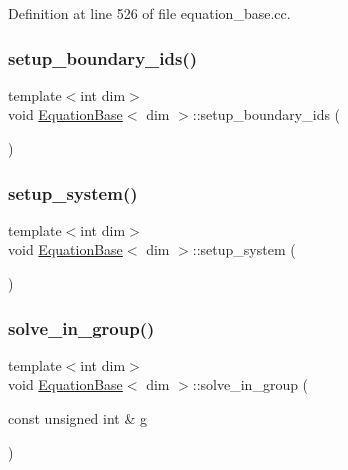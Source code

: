 Definition at line 526 of file equation\+\_\+base.\+cc.

\mbox{\label{class_equation_base_aeeac77cdccc1907fe6e53b27e614ee86}} 
\subsubsection{\texorpdfstring{setup\+\_\+boundary\+\_\+ids()}{setup\_boundary\_ids()}}
{\footnotesize\ttfamily template$<$int dim$>$ \\
void \hyperlink{class_equation_base}{Equation\+Base}$<$ dim $>$\+::setup\+\_\+boundary\+\_\+ids (\begin{DoxyParamCaption}{ }\end{DoxyParamCaption})\hspace{0.3cm}{\ttfamily [private]}}

\mbox{\label{class_equation_base_af47f226b1564534307552d7d4e72a54d}} 
\subsubsection{\texorpdfstring{setup\+\_\+system()}{setup\_system()}}
{\footnotesize\ttfamily template$<$int dim$>$ \\
void \hyperlink{class_equation_base}{Equation\+Base}$<$ dim $>$\+::setup\+\_\+system (\begin{DoxyParamCaption}{ }\end{DoxyParamCaption})\hspace{0.3cm}{\ttfamily [private]}}

\mbox{\label{class_equation_base_a591282eb0ced01a7f22e29e7f0f44129}} 
\subsubsection{\texorpdfstring{solve\+\_\+in\+\_\+group()}{solve\_in\_group()}}
{\footnotesize\ttfamily template$<$int dim$>$ \\
void \hyperlink{class_equation_base}{Equation\+Base}$<$ dim $>$\+::solve\+\_\+in\+\_\+group (\begin{DoxyParamCaption}\item[{const unsigned int \&}]{g }\end{DoxyParamCaption})\hspace{0.3cm}{\ttfamily [virtual]}}



